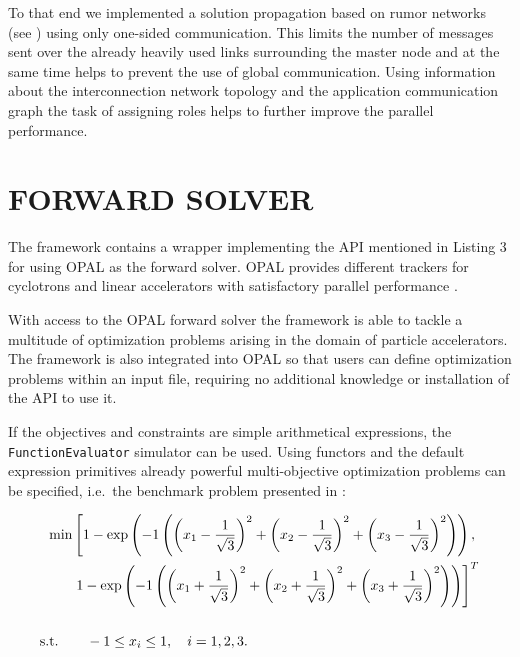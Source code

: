 \documentclass[%
preprint,
preprint,
linenumbers,
amsmath,amssymb,
aps,
prstab,
]{revtex4-1}
\begin{document}
To that end we implemented a solution propagation based on rumor networks 
(see \cite{bgps:06,ayss:09}) using only one-sided communication.
This limits the number of messages sent over the already heavily used links
  surrounding the master node and at the same time helps to prevent the use of
  global communication.
Using information about the interconnection network topology and the
  application communication graph the task of assigning roles helps to further
  improve the parallel performance.



\section{FORWARD SOLVER} \label{sec:forward-solver}

The framework contains a wrapper implementing the API mentioned in
  Listing 3 for using \textsc{OPAL} \cite{opal} as the forward solver.
\textsc{OPAL} provides different trackers for cyclotrons and linear
  accelerators with satisfactory parallel performance \cite{akir:09}.

With access to the \textsc{OPAL} forward solver the framework is able to
  tackle a multitude of optimization problems arising in the domain of
  particle accelerators.
  The framework is also integrated into \textsc{OPAL} so that users can 
  define optimization problems within an input file, requiring no 
  additional knowledge or installation of the API to use it.


If the objectives and constraints are simple arithmetical expressions, the
  \texttt{FunctionEvaluator} simulator can be used.
Using functors and the default expression primitives already powerful
  multi-objective optimization problems can be specified, i.e.\ the benchmark
  problem presented in \cite{hbwh:05}:
%

	\begin{widetext}
		\begin{align} \label{eqn:bench}
		\text{min} & \left[ 1 - \exp \left( -1 \left(
		\left(x_1 - \frac{1}{\sqrt{3}} \right)^2 +
		\left(x_2 - \frac{1}{\sqrt{3}} \right)^2 +
		\left(x_3 - \frac{1}{\sqrt{3}} \right)^2 \right)\right), \right. \\
		\vspace{3em} 
		& \left. 1 - \exp \left( -1 \left(
		\left(x_1 + \frac{1}{\sqrt{3}} \right)^2 +
		\left(x_2 + \frac{1}{\sqrt{3}} \right)^2 +
		\left(x_3 + \frac{1}{\sqrt{3}} \right)^2 \right)\right) \right]^T \nonumber \\
		\vspace{3em} \nonumber \\
		\text{s.t.} \quad & \quad -1 \le x_i \le 1, \quad i=1,2,3 \nonumber
		\text{.} \nonumber
		\end{align}
	\end{widetext}
\end{document}
